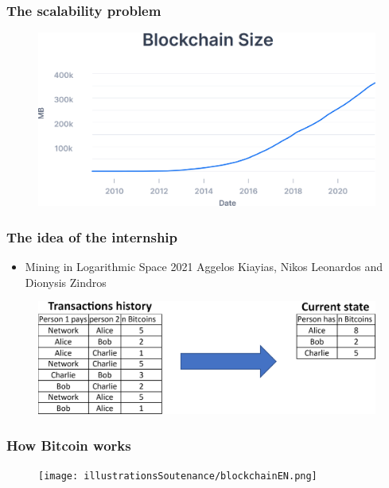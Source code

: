\documentclass{beamer}
\begin{document}

\begin{frame}

\frametitle{The scalability problem}

\begin{figure}[H]
		\includegraphics[width=\linewidth]{illustrationsSoutenance/blockchainSizeSourceless.png}
	\end{figure}

\end{frame}

\begin{frame}

\frametitle{The idea of the internship}

\begin{itemize}
	\item Mining in Logarithmic Space 2021 Aggelos Kiayias, Nikos Leonardos and Dionysis Zindros
\end{itemize}

\begin{figure}[H]
		\includegraphics[width=\linewidth]{illustrationsSoutenance/ideaTitleEN.png}
	\end{figure}

\end{frame}


\begin{frame}

\frametitle{How Bitcoin works}

\begin{figure}[H]
		\texttt{[image: illustrationsSoutenance/blockchainEN.png]}
	\end{figure}

\end{frame}
\end{document}
